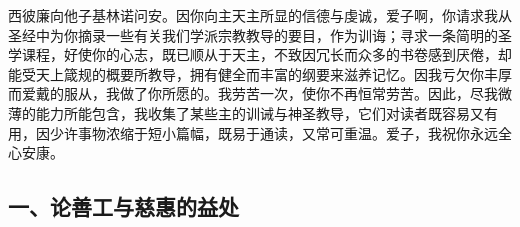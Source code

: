 西彼廉向他子基林诺问安。因你向主天主所显的信德与虔诚，爱子啊，你请求我从圣经中为你摘录一些有关我们学派宗教教导的要目，作为训诲；寻求一条简明的圣学课程，好使你的心志，既已顺从于天主，不致因冗长而众多的书卷感到厌倦，却能受天上箴规的概要所教导，拥有健全而丰富的纲要来滋养记忆。因我亏欠你丰厚而爱戴的服从，我做了你所愿的。我劳苦一次，使你不再恒常劳苦。因此，尽我微薄的能力所能包含，我收集了某些主的训诫与神圣教导，它们对读者既容易又有用，因少许事物浓缩于短小篇幅，既易于通读，又常可重温。爱子，我祝你永远全心安康。\par


\subsection{一、论善工与慈惠的益处}

